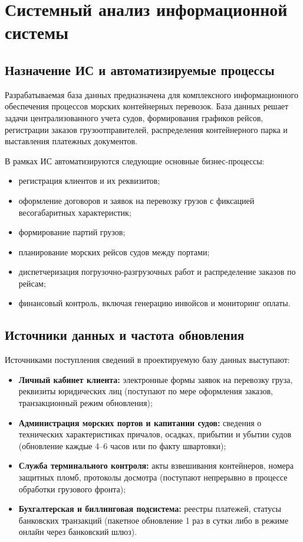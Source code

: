 \documentclass[a4paper,14pt]{article}
\begin{document}
\newpage
\section{Системный анализ информационной системы}

\subsection{Назначение ИС и автоматизируемые процессы}
Разрабатываемая база данных предназначена для комплексного информационного обеспечения процессов морских контейнерных перевозок. База данных решает задачи централизованного учета судов, формирования графиков рейсов, регистрации заказов грузоотправителей, распределения контейнерного парка и выставления платежных документов.

В рамках ИС автоматизируются следующие основные бизнес-процессы:
\begin{itemize}
    \item регистрация клиентов и их реквизитов;
    \item оформление договоров и заявок на перевозку грузов с фиксацией весогабаритных характеристик;
    \item формирование партий грузов;
    \item планирование морских рейсов судов между портами;
    \item диспетчеризация погрузочно-разгрузочных работ и распределение заказов по рейсам;
    \item финансовый контроль, включая генерацию инвойсов и мониторинг оплаты.
\end{itemize}

\subsection{Источники данных и частота обновления}
Источниками поступления сведений в проектируемую базу данных выступают:
\begin{itemize}
    \item \textbf{Личный кабинет клиента:} электронные формы заявок на перевозку груза, реквизиты юридических лиц (поступают по мере оформления заказов, транзакционный режим обновления);
    \item \textbf{Администрация морских портов и капитании судов:} сведения о технических характеристиках причалов, осадках, прибытии и убытии судов (обновление каждые 4--6 часов или по факту швартовки);
    \item \textbf{Служба терминального контроля:} акты взвешивания контейнеров, номера защитных пломб, протоколы досмотра (поступают непрерывно в процессе обработки грузового фронта);
    \item \textbf{Бухгалтерская и биллинговая подсистема:} реестры платежей, статусы банковских транзакций (пакетное обновление 1 раз в сутки либо в режиме онлайн через банковский шлюз).
\end{itemize}
\end{document}
